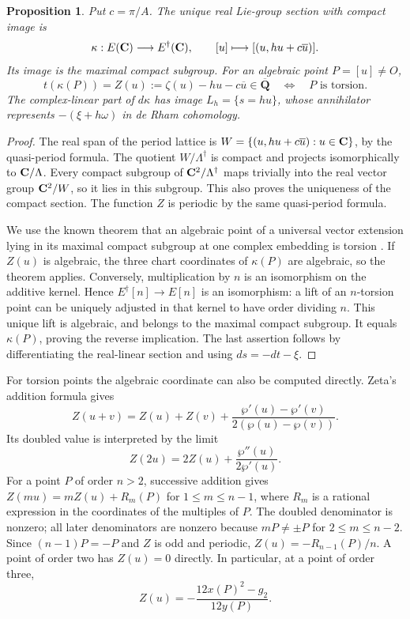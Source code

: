 \documentclass[11pt]{article}
\newtheorem{proposition}[theorem]{Proposition}
\theoremstyle{definition}\newtheorem{definition}[theorem]{Definition}
\theoremstyle{remark}\newtheorem{remark}[theorem]{Remark}
\newcommand{\Qb}{\overline{\mathbf Q}}\newcommand{\Fp}{\mathbf F_p}
\begin{document}
\begin{proposition}\label{prop:unitary-lift}
Put $c=\pi/A$. The unique real Lie-group section with compact image is
\[
 \kappa:E(\mathbf C)\longrightarrow E^\dagger(\mathbf C),\qquad
 [u]\longmapsto[(u,hu+c\overline u)].
\]
Its image is the maximal compact subgroup. For an algebraic point $P=[u]\ne O$,
\[
 t(\kappa(P))=Z(u):=\zeta(u)-hu-c\overline u\in\Qb
 \quad\Longleftrightarrow\quad P\text{ is torsion}.
\]
The complex-linear part of $d\kappa$ has image $L_h=\{s=hu\}$, whose annihilator represents $-(\xi+h\omega)$ in de Rham cohomology.
\end{proposition}
\begin{proof}
The real span of the period lattice is
$W=\{(u,hu+c\overline u):u\in\mathbf C\}$, by the quasi-period formula. The quotient $W/\Lambda^\dagger$ is compact and projects isomorphically to $\mathbf C/\Lambda$. Every compact subgroup of $\mathbf C^2/\Lambda^\dagger$ maps trivially into the real vector group $\mathbf C^2/W$, so it lies in this subgroup. This also proves the uniqueness of the compact section. The function $Z$ is periodic by the same quasi-period formula.

We use the known theorem that an algebraic point of a universal vector extension lying in its maximal compact subgroup at one complex embedding is torsion \cite[Theorem 3.1.2, p.~386]{BostKunnemann}. If $Z(u)$ is algebraic, the three chart coordinates of $\kappa(P)$ are algebraic, so the theorem applies. Conversely, multiplication by $n$ is an isomorphism on the additive kernel. Hence $E^\dagger[n]\to E[n]$ is an isomorphism: a lift of an $n$-torsion point can be uniquely adjusted in that kernel to have order dividing $n$. This unique lift is algebraic, and belongs to the maximal compact subgroup. It equals $\kappa(P)$, proving the reverse implication. The last assertion follows by differentiating the real-linear section and using $ds=-dt-\xi$.
\end{proof}

For torsion points the algebraic coordinate can also be computed directly. Zeta's addition formula gives
\[
 Z(u+v)=Z(u)+Z(v)
 +\frac{\wp'(u)-\wp'(v)}{2(\wp(u)-\wp(v))}.
\]
Its doubled value is interpreted by the limit
\[
 Z(2u)=2Z(u)+\frac{\wp''(u)}{2\wp'(u)}.
\]
For a point $P$ of order $n>2$, successive addition gives
$Z(mu)=mZ(u)+R_m(P)$ for $1\le m\le n-1$, where $R_m$ is a rational expression in the coordinates of the multiples of $P$. The doubled denominator is nonzero; all later denominators are nonzero because $mP\ne\pm P$ for $2\le m\le n-2$. Since $(n-1)P=-P$ and $Z$ is odd and periodic, $Z(u)=-R_{n-1}(P)/n$. A point of order two has $Z(u)=0$ directly. In particular, at a point of order three,
\[
                    Z(u)=-\frac{12x(P)^2-g_2}{12y(P)}.
\]
\end{document}
